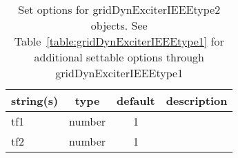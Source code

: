 \begin{table}[ht]
\centering
\begin{tabular}{p{5cm} c c p{7cm}}
\hline
string(s) & type & default & description \\
\hline
tf1 & number & 1 & \\
tf2 & number & 1 & \\
\hline
\end{tabular}
\caption{Set options for gridDynExciterIEEEtype2 objects. See Table~\ref{table:gridDynExciterIEEEtype1} for additional settable options through gridDynExciterIEEEtype1}
\label{table:gridDynExciterIEEEtype2}
\end{table}
